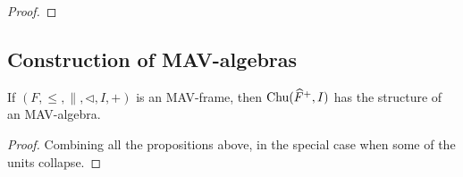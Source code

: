 \begin{proof}
\end{proof}

\subsection{Construction of MAV-algebras}

\begin{theorem}
  If $(F, \leq, \parallel, \lhd, I, +)$ is an MAV-frame, then
  $\mathrm{Chu}(\widehat{F}^+, I)$ has the structure of an MAV-algebra.
\end{theorem}

\begin{proof}
  Combining all the propositions above, in the special case when some
  of the units collapse.
\end{proof}
